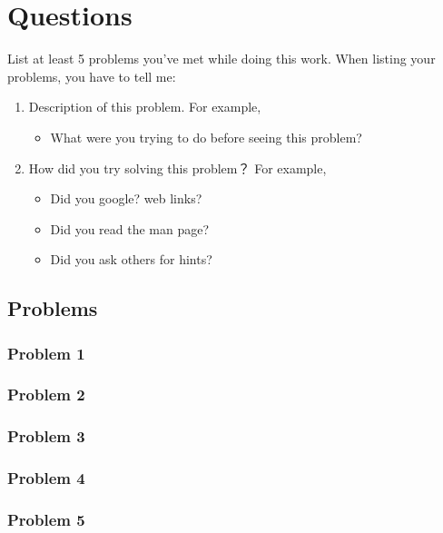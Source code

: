 \documentclass{swfulabreport}
\begin{document}
\section{Questions}
\label{sec:orgbf4dc21}
List at least 5 problems you've met while doing this work. When
listing your problems, you have to tell me:
\begin{enumerate}
\item Description of this problem. For example,
\begin{itemize}
\item What were you trying to do before seeing this problem?
\end{itemize}
\item How did you try solving this problem？ For example,
\begin{itemize}
\item Did you google? web links?
\item Did you read the man page?
\item Did you ask others for hints?
\end{itemize}
\end{enumerate}

\subsection{Problems}
\label{sec:org81554a6}

\subsubsection{Problem 1}
\label{sec:org7f96be3}

\subsubsection{Problem 2}
\label{sec:org34f7e1c}

\subsubsection{Problem 3}
\label{sec:orgf7e9237}

\subsubsection{Problem 4}
\label{sec:org7b84558}

\subsubsection{Problem 5}
\label{sec:orgaed36c2}
\end{document}
